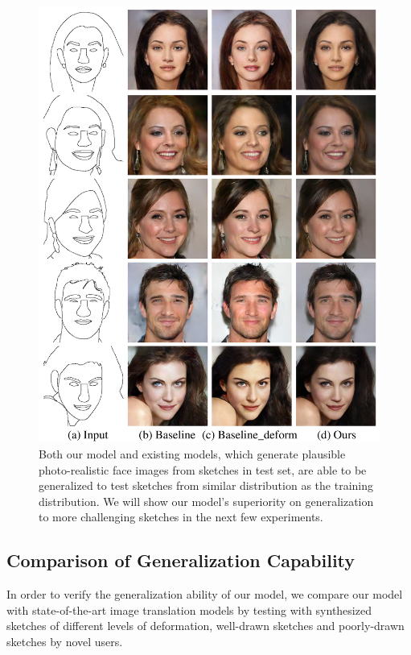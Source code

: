 \begin{figure}
	\includegraphics[width=0.9\linewidth]{figs/results}
	\caption{Both our model and existing models, which generate plausible photo-realistic face images from sketches in test set, are able to be generalized to test sketches from similar distribution as the training distribution. We will show our model's superiority on generalization to more challenging sketches in the next few experiments.}
	\label{fig:generative_quality}
\end{figure}

\subsection{Comparison of Generalization Capability}

In order to verify the generalization ability of our model, we compare our model with state-of-the-art image translation models by testing with synthesized sketches of different levels of deformation, well-drawn sketches and poorly-drawn sketches by novel users.

